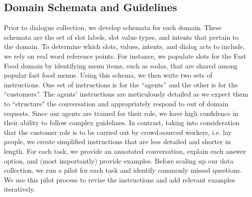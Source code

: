 \subsection{Domain Schemata and Guidelines}
Prior to dialogue collection, we develop schemata for each domain.
These schemata are the set of slot labels, slot value types, and intents that pertain to the domain.  
%
To determine which slots, values, intents, and dialog acts to include, we rely on real word reference points. 
%
For instance, we populate slots for the Fast Food domain by identifying menu items, such as sodas, that are shared among popular fast food menus. Using this schema, we then write two sets of instructions. One set of instructions is for the ``agents'' and the other is for the ``customers''.  
%
The agents' instructions are meticulously detailed as we expect them to ``structure" the conversation and appropriately respond to out of domain requests.  Since our agents are trained for their role, we have high confidence in their ability to follow complex guidelines. In contrast, taking into consideration that the customer role is to be carried out by crowd-sourced workers, i.e. lay people, we create simplified instructions that are less detailed and shorter in length.  
%
For each task, we provide an annotated conversation, explain each answer option, and (most importantly) provide examples.
%
Before scaling up our data collection, we run a pilot for each task and identify commonly missed questions. We use this pilot process to revise the instructions and add relevant examples iteratively.
